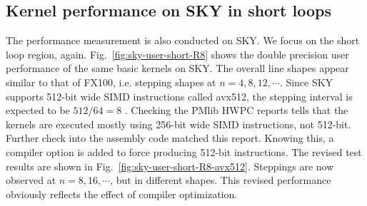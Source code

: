 \documentclass[conference]{IEEEtran}
\begin{document}
\subsection{Kernel performance on SKY in short loops}
\label{subsection:short-kernels-sky}

The performance measurement is also conducted on SKY.
We focus on the short loop region, again.
Fig.~\ref{fig:sky-user-short-R8}
shows the double precision user performance of the same basic kernels on SKY.
The overall line shapes appear similar to that of FX100,
i.e.  stepping shapes at $ n=4,8,12,\cdots $.
Since SKY supports 512-bit wide SIMD instructions called avx512,
the stepping interval is expected to be
\begin{math}
512 / 64 = 8
\end{math}
.
Checking the PMlib HWPC reports tells that the kernels are executed
mostly using 256-bit wide SIMD instructions, not 512-bit.
Further check into the assembly code matched this report.
Knowing this, a compiler option is added to force producing 512-bit instructions.
The revised test results are shown in
Fig.~\ref{fig:sky-user-short-R8-avx512}.
Steppings are now observed at $ n=8,16,\cdots $, but in different shapes.
This revised performance obviously reflects the effect of compiler optimization.
\end{document}
